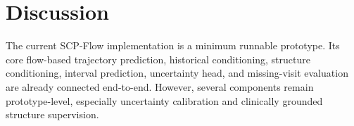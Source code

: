 \section{Discussion}

The current SCP-Flow implementation is a minimum runnable prototype. Its core flow-based trajectory prediction, historical conditioning, structure conditioning, interval prediction, uncertainty head, and missing-visit evaluation are already connected end-to-end. However, several components remain prototype-level, especially uncertainty calibration and clinically grounded structure supervision.
